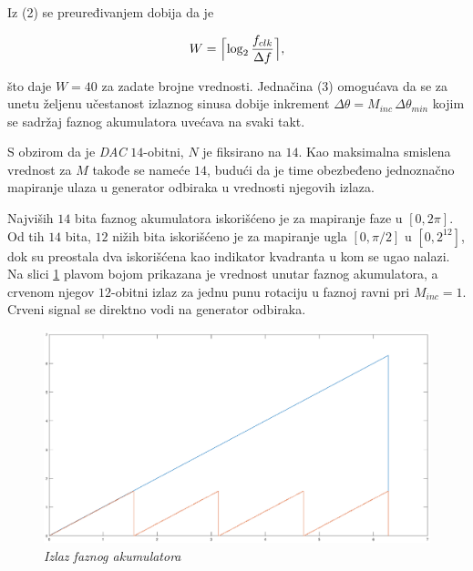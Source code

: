 \documentclass[conference]{IEEEtran}
\DeclarePairedDelimiter{\ceil}{\lceil}{\rceil}
\begin{document}
Iz (2) se preuređivanjem dobija da je 

\begin{equation}
W = \ceil[\Big]{\log_2{\frac{f_{clk}}{\Delta f}}} ,
\end{equation}

\noindent što daje $W = 40$ za zadate brojne vrednosti. 
Jednačina (3) omogućava da se za unetu željenu učestanost izlaznog sinusa dobije inkrement $\Delta \theta=M_{inc}\,\Delta \theta_{min}$ kojim se sadržaj faznog akumulatora uvećava na svaki takt. 

S obzirom da je \textsl{DAC} $14$-obitni, $N$ je fiksirano na $14$. Kao maksimalna smislena vrednost za $M$ takođe se nameće $14$, budući da je time obezbeđeno jednoznačno mapiranje ulaza u generator odbiraka u vrednosti njegovih izlaza.

Najviših $14$ bita faznog akumulatora iskorišćeno je za mapiranje faze u $[0, 2\pi]$. Od tih $14$ bita, $12$ nižih bita iskorišćeno je za mapiranje ugla $[0, \pi/2]$ u $[0, 2^{12}]$, dok su preostala dva iskorišćena kao indikator kvadranta u kom se ugao nalazi. Na slici \ref{slika:fazniAcc} plavom bojom prikazana je vrednost unutar faznog akumulatora, a crvenom njegov $12$-obitni izlaz za jednu punu rotaciju u faznoj ravni pri $M_{inc}=1$. Crveni signal se direktno vodi na generator odbiraka.

\begin{figure}[h]
	\centering
	\includegraphics[scale=0.16]{./slike/izlazFaznogAkumulatora.eps}
	\caption{\textsl{Izlaz faznog akumulatora}}
	\label{slika:fazniAcc}
\end{figure}

\end{document}
